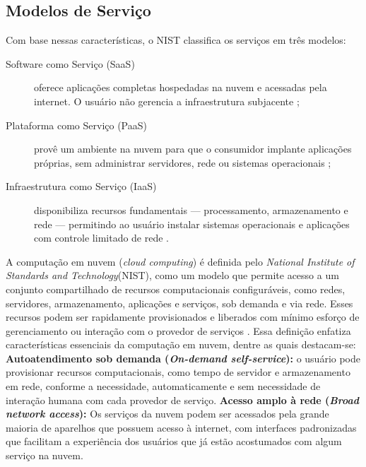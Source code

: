 \subsection{Modelos de Serviço}

Com base nessas características, o NIST classifica os serviços em três modelos:

\begin{description}
    \item[Software como Serviço (SaaS)] oferece aplicações completas hospedadas na nuvem e acessadas pela internet. O usuário não gerencia a infraestrutura subjacente \cite{mell2011};
    \item[Plataforma como Serviço (PaaS)] provê um ambiente na nuvem para que o consumidor implante aplicações próprias, sem administrar servidores, rede ou sistemas operacionais \cite{mell2011};
    \item[Infraestrutura como Serviço (IaaS)] disponibiliza recursos fundamentais — processamento, armazenamento e rede — permitindo ao usuário instalar sistemas operacionais e aplicações com controle limitado de rede \cite{mell2011}.
\end{description}



A computação em nuvem (\textit{cloud computing}) é definida pelo \textit{National Institute of Standards and Technology}(NIST), como um modelo que permite acesso a um conjunto compartilhado de recursos computacionais configuráveis, como redes, servidores, armazenamento, aplicações e serviços,  sob demanda e via rede. Esses recursos podem ser rapidamente provisionados e liberados com mínimo esforço de gerenciamento ou interação com o provedor de serviços \cite{mell2011}. Essa definição enfatiza características essenciais da computação em nuvem, dentre as quais destacam-se: 
\textbf{Autoatendimento sob demanda (\textit{On-demand self-service}):} o usuário pode provisionar recursos computacionais, como tempo de servidor e armazenamento em rede, conforme a necessidade, automaticamente e sem necessidade de interação humana com cada provedor de serviço.
\textbf{Acesso amplo à rede (\textit{Broad network access}):} Os serviços da nuvem podem ser acessados pela grande maioria de aparelhos que possuem acesso à internet, com interfaces padronizadas que facilitam a experiência dos usuários que já estão acostumados com algum serviço na nuvem.
 
